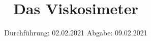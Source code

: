 

\subject{107}
\title{Das Viskosimeter}
\date{%
  Durchführung: 02.02.2021
  \hspace{3em}
  Abgabe: 09.02.2021
}



\maketitle
\thispagestyle{empty}
\tableofcontents
\newpage








\printbibliography{}


